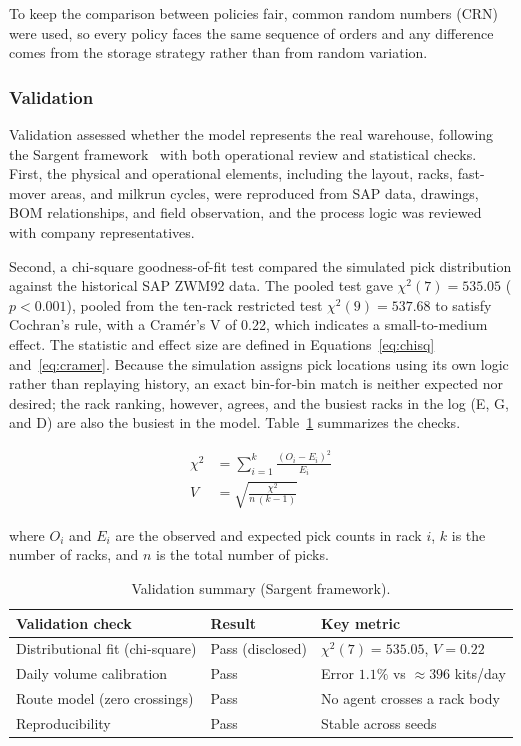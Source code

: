 \documentclass[conference]{IEEEtran}
\begin{document}
To keep the comparison between policies fair, common random numbers (CRN) were
used, so every policy faces the same sequence of orders and any difference
comes from the storage strategy rather than from random variation.

\subsubsection{Validation}
Validation assessed whether the model represents the real warehouse, following
the Sargent framework~\cite{sargent2013} with both operational review and
statistical checks. First, the physical and operational elements, including
the layout, racks, fast-mover areas, and milkrun cycles, were reproduced from
SAP data, drawings, BOM relationships, and field observation, and the process
logic was reviewed with company representatives.

Second, a chi-square goodness-of-fit test compared the simulated pick
distribution against the historical SAP ZWM92 data. The pooled test gave
$\chi^2(7)=535.05$ ($p<0.001$), pooled from the ten-rack restricted test
$\chi^2(9)=537.68$ to satisfy Cochran's rule, with a Cramér's V of 0.22,
which indicates a small-to-medium effect. The statistic and effect size are
defined in Equations~\eqref{eq:chisq} and~\eqref{eq:cramer}. Because the
simulation assigns pick locations using its own logic rather than replaying
history, an exact bin-for-bin match is neither expected nor desired; the rack
ranking, however, agrees, and the busiest racks in the log (E, G, and D) are
also the busiest in the model. Table~\ref{tab:validate} summarizes the checks.

\begin{align}
\chi^2 &= \sum_{i=1}^{k}\frac{(O_i-E_i)^2}{E_i} \label{eq:chisq}\\[2pt]
V &= \sqrt{\frac{\chi^2}{n\,(k-1)}} \label{eq:cramer}
\end{align}

\noindent where $O_i$ and $E_i$ are the observed and expected pick counts in
rack $i$, $k$ is the number of racks, and $n$ is the total number of picks.

\begin{table}[htbp]
\centering
\caption{Validation summary (Sargent framework).}
\label{tab:validate}
\begin{tabular}{lll}
\toprule
Validation check & Result & Key metric \\
\midrule
Distributional fit (chi-square) & Pass (disclosed) & $\chi^2(7)=535.05$, $V=0.22$ \\
Daily volume calibration & Pass & Error $1.1\%$ vs $\approx396$ kits/day \\
Route model (zero crossings) & Pass & No agent crosses a rack body \\
Reproducibility & Pass & Stable across seeds \\
\bottomrule
\end{tabular}
\end{table}
\end{document}

